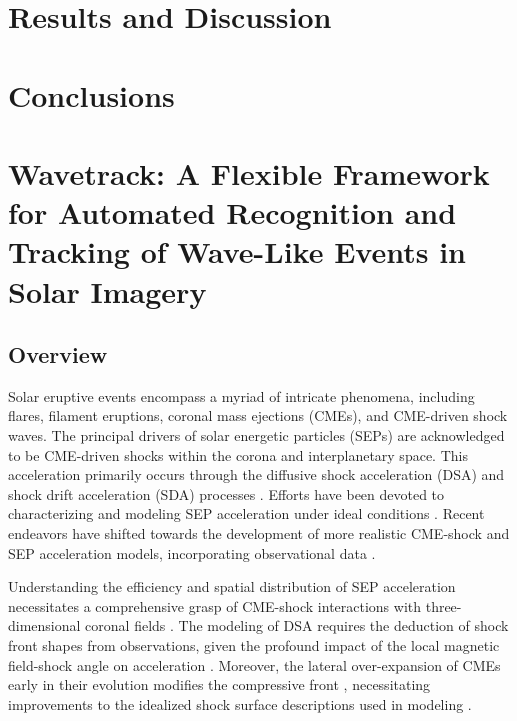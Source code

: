 \section{Results and Discussion}

\section{Conclusions}





\section{Wavetrack: A Flexible Framework for Automated Recognition and Tracking of Wave-Like Events in Solar Imagery}
\subsection{Overview}
Solar eruptive events encompass a myriad of intricate phenomena, including flares, filament eruptions, coronal mass ejections (CMEs), and CME-driven shock waves. The principal drivers of solar energetic particles (SEPs) are acknowledged to be CME-driven shocks within the corona and interplanetary space. This acceleration primarily occurs through the diffusive shock acceleration (DSA) and shock drift acceleration (SDA) processes \citep{reames_2021}. Efforts have been devoted to characterizing and modeling SEP acceleration under ideal conditions \citep{vainio_2008, sokolov_2009, kozarev_2013}. Recent endeavors have shifted towards the development of more realistic CME-shock and SEP acceleration models, incorporating observational data \citep{vourlidas_2012, kwon_2014, kozarev_2015, kozarev_2019}.

Understanding the efficiency and spatial distribution of SEP acceleration necessitates a comprehensive grasp of CME-shock interactions with three-dimensional coronal fields \cite{rouillard_2016}. The modeling of DSA requires the deduction of shock front shapes from observations, given the profound impact of the local magnetic field-shock angle on acceleration \cite{guo_2013}. Moreover, the lateral over-expansion of CMEs early in their evolution modifies the compressive front \cite{bein_2011, temmer_2016}, necessitating improvements to the idealized shock surface descriptions used in modeling \citep{vourlidas_2012, kwon_2014, rouillard_2016}.

